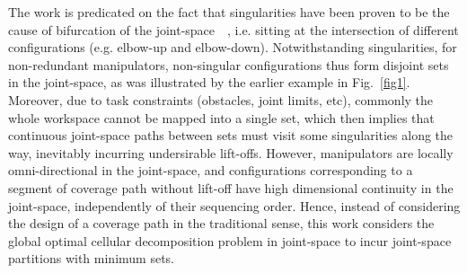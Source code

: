 \documentclass[journal]{IEEEtran}
\begin{document}
%
%
The work is predicated on the fact that singularities have been proven to be the cause of bifurcation of the joint-space~\cite{porta2010path}~\cite{Porta2012Randomized}, i.e. sitting at the intersection of different configurations (e.g. elbow-up and elbow-down).
Notwithstanding singularities, for non-redundant manipulators, non-singular configurations thus form disjoint sets in the joint-space, as was illustrated by the earlier example in Fig.~\ref{fig1}. 
Moreover, due to task constraints (obstacles, joint limits, etc), commonly the whole workspace cannot be mapped into a single set, which then implies that continuous joint-space paths between sets must visit some singularities along the way, inevitably incurring undersirable lift-offs. 
However, manipulators are locally omni-directional in the joint-space, and configurations corresponding to a segment of coverage path without lift-off have high dimensional continuity in the joint-space, independently of their sequencing order. 
Hence, instead of considering the design of a coverage path in the traditional sense, this work considers the global optimal cellular decomposition problem in joint-space to incur joint-space partitions with minimum sets. 
\end{document}

